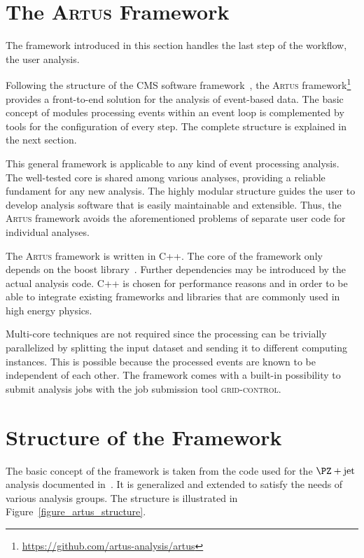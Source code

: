 \documentclass[3p]{elsarticle}
\newcommand{\software}[1]{\textsc{#1}\xspace}
\newcommand{\artus}{\software{Artus}}
\begin{document}
\section{The \artus Framework}
\label{section_artus_motivation}

The framework introduced in this section handles the last step of the workflow, the user analysis.

Following the structure of the CMS software framework~\cite{cms, cmssw}, the \artus framework\footnote{\url{https://github.com/artus-analysis/artus}} provides a front-to-end solution for the analysis of event-based data.
The basic concept of modules processing events within an event loop is complemented by tools for the configuration of every step.
The complete structure is explained in the next section.

This general framework is applicable to any kind of event processing analysis.
The well-tested core is shared among various analyses, providing a reliable fundament for any new analysis.
The highly modular structure guides the user to develop analysis software that is easily maintainable and extensible.
Thus, the \artus framework avoids the aforementioned problems of separate user code for individual analyses.

The \artus framework is written in C++.
The core of the framework only depends on the boost library~\cite{boost}.
Further dependencies may be introduced by the actual analysis code.
C++ is chosen for performance reasons and in order to be able to integrate existing frameworks and libraries that are commonly used in high energy physics.

Multi-core techniques are not required since the processing can be trivially parallelized by splitting the input dataset and sending it to different computing instances.
This is possible because the processed events are known to be independent of each other.
The framework comes with a built-in possibility to submit analysis jobs with the job submission tool \software{grid-control}.

\section{Structure of the Framework}
\label{section_artus_structure}

The basic concept of the framework is taken from the code used for the $\PZ+\text{jet}$ analysis documented in~\cite{joram_phd}.
It is generalized and extended to satisfy the needs of various analysis groups.
The structure is illustrated in Figure~\ref{figure_artus_structure}.
\end{document}
